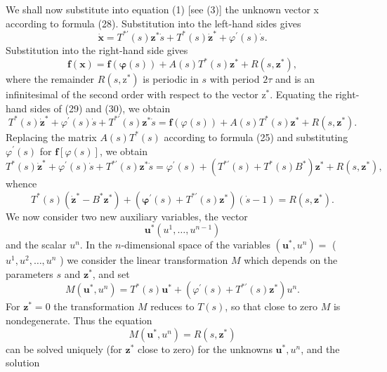 \documentclass[10pt,a5paper]{book}
\makeatletter
\theoremstyle{plain}
\theoremstyle{definition}
\theoremstyle{remark}
\renewenvironment{proof}[1][\proofname]{\par
  \pushQED{\qed}%
  \normalfont\topsep6\p@\@plus6\p@\relax
  \trivlist
  \item\relax{\itshape #1\@addpunct{.}}\hspace\labelsep\ignorespaces
}{\popQED\endtrivlist\@endpefalse}
\makeatother
\begin{document}
\begin{proof}[Proof of Theorem 26]
We shall now substitute into equation (1) [see (3)] the unknown vector x according to formula (28). Substitution into the left-hand sides gives
\begin{equation*}
\dot{\mathbf{x}}=T^{* \prime}(s) \mathbf{z}^{*} \dot{s}+T^{*}(s) \dot{\mathbf{z}}^{*}+\varphi^{\prime}(s) \dot{s} . \tag{29}
\end{equation*}
Substitution into the right-hand side gives
\begin{equation*}
\mathbf{f}(\mathbf{x})=\mathbf{f}(\boldsymbol{\varphi}(s))+A(s) T^{*}(s) \mathbf{z}^{*}+R\left(s, \mathbf{z}^{*}\right), \tag{30}
\end{equation*}
where the remainder $R\left(s, \mathrm{z}^{*}\right)$ is periodic in $s$ with period $2 \tau$ and is an infinitesimal of the second order with respect to the vector $\mathrm{z}^{*}$. Equating the right-hand sides of (29) and (30), we obtain
\[
T^{*}(s) \dot{\mathbf{z}}^{*}+\varphi^{\prime}(s) \dot{s}+T^{* \prime}(s) \mathbf{z}^{*} \dot{s}=\mathbf{f}(\varphi(s))+A(s) T^{*}(s) \mathbf{z}^{*}+R\left(s, \mathbf{z}^{*}\right) .
\]
Replacing the matrix $A(s) T^{*}(s)$ according to formula (25) and substituting $\varphi^{\prime}(s)$ for $\mathbf{f}[\varphi(s)]$, we obtain
\[
T^{*}(s) \dot{\mathbf{z}}^{*}+\varphi^{\prime}(s) \dot{s}+T^{* \prime}(s) \mathbf{z}^{*} \dot{s}=\varphi^{\prime}(s)+\left(T^{* \prime}(s)+T^{*}(s) B^{*}\right) \mathbf{z}^{*}+R\left(s, \mathbf{z}^{*}\right),
\]
whence
\begin{equation*}
T^{*}(s)\left(\dot{\mathbf{z}}^{*}-B^{*} \mathbf{z}^{*}\right)+\left(\boldsymbol{\varphi}^{\prime}(s)+T^{* \prime}(s) \mathbf{z}^{*}\right)(\dot{s}-1)=R\left(s, \mathbf{z}^{*}\right) . \tag{31}
\end{equation*}
We now consider two new auxiliary variables, the vector
\[
\mathbf{u}^{*}\left(u^{1}, \ldots, u^{n-1}\right)
\]
and the scalar $u^{n}$. In the $n$-dimensional space of the variables $\left(\mathbf{u}^{*}, u^{n}\right)=$ ( $u^{1}, u^{2}, \ldots, u^{n}$ ) we consider the linear transformation $M$ which depends on the parameters $s$ and $\mathbf{z}^{*}$, and set
\[
M\left(\mathbf{u}^{*}, u^{n}\right)=T^{*}(s) \mathbf{u}^{*}+\left(\varphi^{\prime}(s)+T^{* \prime}(s) \mathbf{z}^{*}\right) u^{n} .
\]
For $\mathbf{z}^{*}=0$ the transformation $M$ reduces to $T(s)$, so that close to zero $M$ is nondegenerate. Thus the equation
\[
M\left(\mathbf{u}^{*}, u^{n}\right)=R\left(s, \mathbf{z}^{*}\right)
\]
can be solved uniquely (for $\mathbf{z}^{*}$ close to zero) for the unknowns $\mathbf{u}^{*}, u^{n}$, and the solution
\[
\begin{aligned}

\end{aligned}\]
\end{proof}
\end{document}

